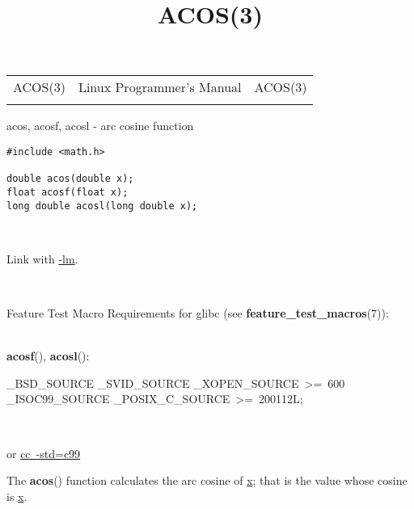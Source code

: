 \documentclass[]{article}
\title{ACOS(3)}
\author{}
\date{}
\let\realtextbf=\textbf
\renewcommand{\textbf}[1]{\textcolor{boldcolor}{\realtextbf{#1}}}
\renewcommand{\emph}[1]{\underline{#1}}
\begin{document}
\maketitle

\begin{longtable}[c]{@{}lll@{}}
\toprule\addlinespace
ACOS(3) & Linux Programmer's Manual & ACOS(3)
\\\addlinespace
\bottomrule
\end{longtable}


acos, acosf, acosl - arc cosine function


\begin{verbatim}
#include <math.h>
 
double acos(double x);
float acosf(float x);
long double acosl(long double x);
\end{verbatim}

~

Link with \emph{-lm}.

~

Feature Test Macro Requirements for glibc (see
\textbf{feature\_test\_macros}(7)): \\

~

\textbf{acosf}(), \textbf{acosl}():

\_BSD\_SOURCE \textbar{}\textbar{} \_SVID\_SOURCE \textbar{}\textbar{}
\_XOPEN\_SOURCE~\textgreater{}=~600 \textbar{}\textbar{}
\_ISOC99\_SOURCE \textbar{}\textbar{}
\_POSIX\_C\_SOURCE~\textgreater{}=~200112L;

~

or \emph{cc~-std=c99}


The \textbf{acos}() function calculates the arc cosine of \emph{x}; that
is the value whose cosine is \emph{x}.
\end{document}
